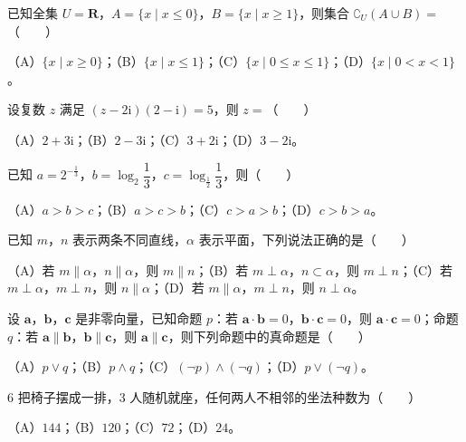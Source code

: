 \begin{question}
已知全集 $U=\mathbf R$，$A=\{x\mid x\leqslant 0\}$，$B=\{x\mid x\geqslant 1\}$，则集合 $\complement_U(A\cup B)=$\mbox{（　　）}

（A）$\{x\mid x\geqslant 0\}$；（B）$\{x\mid x\leqslant 1\}$；（C）$\{x\mid 0\leqslant x\leqslant 1\}$；（D）$\{x\mid 0<x<1\}$。

\end{question}
\begin{question}
设复数 $z$ 满足 $(z-2\mathrm i)(2-\mathrm i)=5$，则 $z=$\mbox{（　　）}

（A）$2+3\mathrm i$；（B）$2-3\mathrm i$；（C）$3+2\mathrm i$；（D）$3-2\mathrm i$。

\end{question}
\begin{question}
已知 $a=2^{-\frac13}$，$b=\log_2\dfrac13$，$c=\log_{\frac12}\dfrac13$，则\mbox{（　　）}

（A）$a>b>c$；（B）$a>c>b$；（C）$c>a>b$；（D）$c>b>a$。

\end{question}
\begin{question}
已知 $m$，$n$ 表示两条不同直线，$\alpha$ 表示平面，下列说法正确的是\mbox{（　　）}

（A）若 $m\parallel\alpha$，$n\parallel\alpha$，则 $m\parallel n$；（B）若 $m\perp\alpha$，$n\subset\alpha$，则 $m\perp n$；（C）若 $m\perp\alpha$，$m\perp n$，则 $n\parallel\alpha$；（D）若 $m\parallel\alpha$，$m\perp n$，则 $n\perp\alpha$。

\end{question}
\begin{question}
设 $\boldsymbol a$，$\boldsymbol b$，$\boldsymbol c$ 是非零向量，已知命题 $p$：若 $\boldsymbol a\cdot\boldsymbol b=0$，$\boldsymbol b\cdot\boldsymbol c=0$，则 $\boldsymbol a\cdot\boldsymbol c=0$；命题 $q$：若 $\boldsymbol a\parallel\boldsymbol b$，$\boldsymbol b\parallel\boldsymbol c$，则 $\boldsymbol a\parallel\boldsymbol c$，则下列命题中的真命题是\mbox{（　　）}

（A）$p\vee q$；（B）$p\wedge q$；（C）$(\neg p)\wedge(\neg q)$；（D）$p\vee(\neg q)$。

\end{question}
\begin{question}
6 把椅子摆成一排，3 人随机就座，任何两人不相邻的坐法种数为\mbox{（　　）}

（A）$144$；（B）$120$；（C）$72$；（D）$24$。

\Needspace{0.4\textheight}
\end{question}
